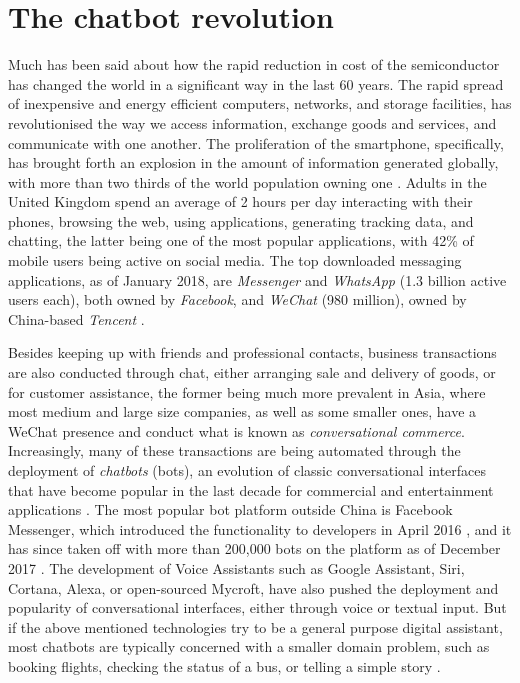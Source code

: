 \section{The chatbot revolution}
Much has been said about how the rapid reduction in cost of the semiconductor has changed the world in a significant way in the last 60 years. The rapid spread of inexpensive and energy efficient computers, networks, and storage facilities, has revolutionised the way we access information, exchange goods and services, and communicate with one another. The proliferation of the smartphone, specifically, has brought forth an explosion in the amount of information generated globally, with more than two thirds of the world population owning one \cite{wearesocial}. Adults in the United Kingdom spend an average of 2 hours per day interacting with their phones, browsing the web, using applications, generating tracking data, and chatting, the latter being one of the most popular applications, with 42\% of mobile users \cite{mobilesocial} being active on social media. The top downloaded messaging applications, as of January 2018, are \textit{Messenger} and \textit{WhatsApp} (1.3 billion active users each), both owned by \textit{Facebook}, and \textit{WeChat} (980 million), owned by China-based \textit{Tencent} \cite{mobilestatista}.

Besides keeping up with friends and professional contacts, business transactions are also conducted through chat, either arranging sale and delivery of goods, or for customer assistance, the former being much more prevalent in Asia, where most medium and large size companies, as well as some smaller ones, have a WeChat presence and conduct what is known as \textit{conversational commerce}. Increasingly, many of these transactions are being automated through the deployment of \textit{chatbots} (bots), an evolution of classic conversational interfaces that have become popular in the last decade for commercial and entertainment applications \cite{Dale2016}. The most popular bot platform outside China is Facebook Messenger, which introduced the functionality to developers in April 2016 \cite{Messenger2016}, and it has since taken off with more than 200,000 bots on the platform as of December 2017 \cite{Messenger2017}. The development of Voice Assistants such as Google Assistant, Siri, Cortana, Alexa, or open-sourced Mycroft, have also pushed the deployment and popularity of conversational interfaces, either through voice or textual input. But if the above mentioned technologies try to be a general purpose digital assistant, most chatbots are typically concerned with a smaller domain problem, such as booking flights, checking the status of a bus, or telling a simple story \cite{meisel}.
